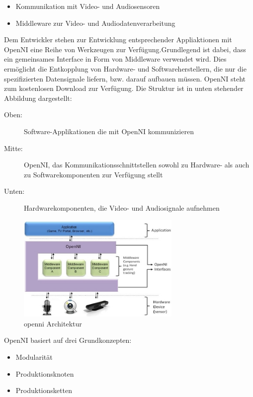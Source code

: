 \begin{itemize}
  \item Kommunikation mit Video- und Audiosensoren
  \item Middleware zur Video- und Audiodatenverarbeitung
\end{itemize}

Dem Entwickler stehen zur Entwicklung entsprechender Appliaktionen mit OpenNI eine Reihe von Werkzeugen zur Verfügung.Grundlegend ist dabei, dass ein gemeinsames Interface in Form von Middleware verwendet wird.
Dies ermöglicht die Entkopplung von Hardware- und Softwareherstellern, die nur die spezifizierten Datensignale liefern, bzw. darauf aufbauen müssen.
OpenNI steht zum kostenlosen Download zur Verfügung.
Die Struktur ist in unten stehender Abbildung dargestellt: 

\begin{description}
 \item[Oben:] Software-Applikationen die mit OpenNI kommunizieren
 \item[Mitte:] OpenNI, das Kommunikationsschnittstellen sowohl zu Hardware- als auch zu Softwarekomponenten zur Verfügung stellt
 \item[Unten:] Hardwarekomponenten, die Video- und Audiosignale aufnehmen
\end{description}

\begin{figure}[h]
	\center
	\includegraphics[width=0.7\textwidth]{graphics/openNI.jpg}
	\caption{\label{fig:openNI} \gls{openni} Architektur \cite{kinect_6}}
\end{figure}

OpenNI basiert auf drei Grundkonzepten:
\begin{itemize}
  \item Modularität
  \item Produktionsknoten
  \item Produktionsketten
\end{itemize}



